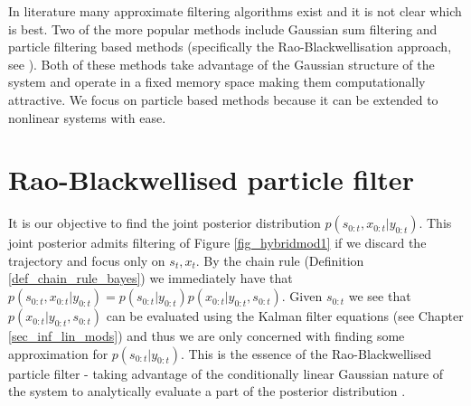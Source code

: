 In literature many approximate filtering algorithms exist and it is not clear which is best. Two of the more popular methods include Gaussian sum filtering \cite{barber2} and particle filtering based methods (specifically the Rao-Blackwellisation approach, see \cite{chen}\cite{doucet}). Both of these methods take advantage of the Gaussian structure of the system and operate in a fixed memory space making them computationally attractive. We focus on particle based methods because it can be extended to nonlinear systems with ease.   

\section{Rao-Blackwellised particle filter}
It is our objective to find the joint posterior distribution $p(s_{0:t}, x_{0:t}|y_{0:t})$. This joint posterior admits filtering of Figure \ref{fig_hybridmod1} if we discard the trajectory and focus only on $s_t,x_t$. By the chain rule (Definition \ref{def_chain_rule_bayes}) we immediately have that $p(s_{0:t}, x_{0:t}|y_{0:t}) = p(s_{0:t}|y_{0:t})p(x_{0:t}|y_{0:t}, s_{0:t})$. Given $s_{0:t}$ we see that $p(x_{0:t}|y_{0:t}, s_{0:t})$ can be evaluated using the Kalman filter equations (see Chapter \ref{sec_inf_lin_mods}) and thus we are only concerned with finding some approximation for $p(s_{0:t}|y_{0:t})$. This is the essence of the Rao-Blackwellised particle filter - taking advantage of the conditionally linear Gaussian nature of the system to analytically evaluate a part of the posterior distribution \cite{doucet}.

